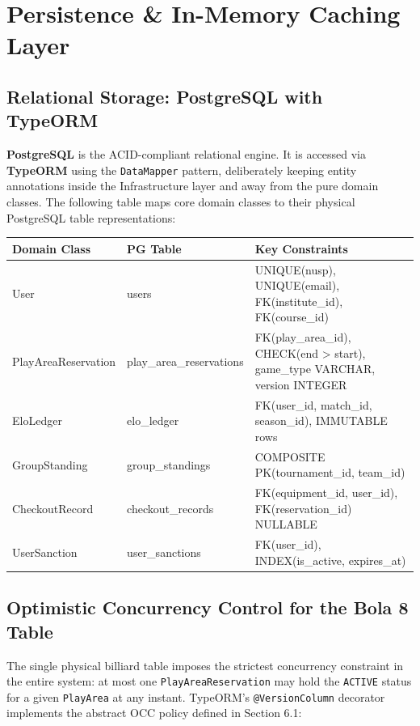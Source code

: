 \documentclass[11pt,a4paper]{report}
\begin{document}
\section{Persistence \& In-Memory Caching Layer}

\subsection{Relational Storage: PostgreSQL with TypeORM}

\textbf{PostgreSQL} is the ACID-compliant relational engine. It is accessed via \textbf{TypeORM} using the \texttt{DataMapper} pattern, deliberately keeping entity annotations inside the Infrastructure layer and away from the pure domain classes. The following table maps core domain classes to their physical PostgreSQL table representations:

\begin{center}
\setlength{\tabcolsep}{5pt}
\begin{tabular}{>{\ttfamily}p{3.8cm} >{\ttfamily}p{3.5cm} p{6.2cm}}
\toprule
\textbf{Domain Class} & \textbf{PG Table} & \textbf{Key Constraints} \\
\midrule
User & users & UNIQUE(nusp), UNIQUE(email), FK(institute\_id), FK(course\_id) \\
PlayAreaReservation & play\_area\_reservations & FK(play\_area\_id), CHECK(end > start), game\_type VARCHAR, version INTEGER \\
EloLedger & elo\_ledger & FK(user\_id, match\_id, season\_id), IMMUTABLE rows \\
GroupStanding & group\_standings & COMPOSITE PK(tournament\_id, team\_id) \\
CheckoutRecord & checkout\_records & FK(equipment\_id, user\_id), FK(reservation\_id) NULLABLE \\
UserSanction & user\_sanctions & FK(user\_id), INDEX(is\_active, expires\_at) \\
\bottomrule
\end{tabular}
\end{center}

\subsection{Optimistic Concurrency Control for the Bola 8 Table}

The single physical billiard table imposes the strictest concurrency constraint in the entire system: at most one \texttt{PlayAreaReservation} may hold the \texttt{ACTIVE} status for a given \texttt{PlayArea} at any instant. TypeORM's \texttt{@VersionColumn} decorator implements the abstract OCC policy defined in Section 6.1:
\end{document}
